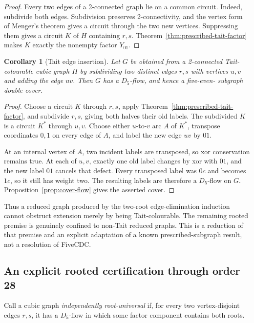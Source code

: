 \documentclass[11pt]{article}
\newtheorem{corollary}[theorem]{Corollary}
\theoremstyle{definition}
\theoremstyle{remark}
\begin{document}
\begin{proof}
Every two edges of a 2-connected graph lie on a common circuit.  Indeed,
subdivide both edges.  Subdivision preserves 2-connectivity, and the vertex
form of Menger's theorem gives a circuit through the two new vertices.
Suppressing them gives a circuit \(K\) of \(H\) containing \(r,s\).
Theorem~\ref{thm:prescribed-tait-factor} makes \(K\) exactly the nonempty
factor \(Y_{01}\).
\end{proof}

\begin{corollary}[Tait edge insertion]\label{cor:tait-edge-insertion}
Let \(G\) be obtained from a 2-connected Tait-colourable cubic graph \(H\)
by subdividing two distinct edges \(r,s\) with vertices \(u,v\) and adding
the edge \(uv\).  Then \(G\) has a \(D_5\)-flow, and hence a five-even-
subgraph double cover.
\end{corollary}

\begin{proof}
Choose a circuit \(K\) through \(r,s\), apply
Theorem~\ref{thm:prescribed-tait-factor}, and subdivide \(r,s\), giving
both halves their old labels.  The subdivided \(K\) is a circuit \(K^*\)
through \(u,v\).  Choose either \(u\)-to-\(v\) arc \(A\) of \(K^*\),
transpose coordinates \(0,1\) on every edge of \(A\), and label the new
edge \(uv\) by \(01\).

At an internal vertex of \(A\), two incident labels are transposed, so xor
conservation remains true.  At each of \(u,v\), exactly one old label
changes by xor with \(01\), and the new label \(01\) cancels that defect.
Every transposed label was \(0c\) and becomes \(1c\), so it still has
weight two.  The resulting labels are therefore a \(D_5\)-flow on \(G\).
Proposition~\ref{prop:cover-flow} gives the asserted cover.
\end{proof}

Thus a reduced graph produced by the two-root edge-elimination induction
cannot obstruct extension merely by being Tait-colourable.  The remaining
rooted premise is genuinely confined to non-Tait reduced graphs.  This is
a reduction of that premise and an explicit adaptation of a known
prescribed-subgraph result, not a resolution of FiveCDC.

\subsection{An explicit rooted certification through order 28}

Call a cubic graph \emph{independently root-universal} if, for every two
vertex-disjoint edges \(r,s\), it has a \(D_5\)-flow in which some factor
component contains both roots.
\end{document}
